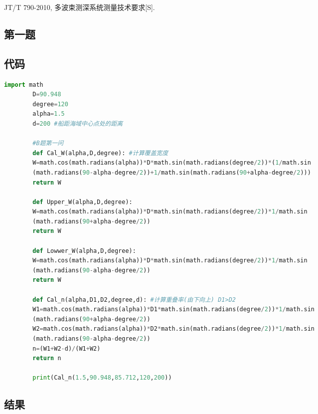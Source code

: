 \documentclass{cumcmthesis}
\begin{document}
\begin{thebibliography}{9}%
	 JT/T 790-2010, 多波束测深系统测量技术要求[S].
\end{thebibliography}
\newpage
\begin{appendices}
	\section{第一题}
	\subsection{代码}
	\begin{lstlisting}[language=python]
		import math
		D=90.948
		degree=120
		alpha=1.5
		d=200 #船距海域中心点处的距离
		
		#B题第一问
		def Cal_W(alpha,D,degree): #计算覆盖宽度
		W=math.cos(math.radians(alpha))*D*math.sin(math.radians(degree/2))*(1/math.sin
		(math.radians(90-alpha-degree/2))+1/math.sin(math.radians(90+alpha-degree/2)))
		return W
		
		def Upper_W(alpha,D,degree):
		W=math.cos(math.radians(alpha))*D*math.sin(math.radians(degree/2))*1/math.sin
		(math.radians(90+alpha-degree/2))
		return W
		
		def Lowwer_W(alpha,D,degree):
		W=math.cos(math.radians(alpha))*D*math.sin(math.radians(degree/2))*1/math.sin
		(math.radians(90-alpha-degree/2))
		return W
		
		def Cal_n(alpha,D1,D2,degree,d): #计算重叠率(由下向上) D1>D2
		W1=math.cos(math.radians(alpha))*D1*math.sin(math.radians(degree/2))*1/math.sin
		(math.radians(90+alpha-degree/2))
		W2=math.cos(math.radians(alpha))*D2*math.sin(math.radians(degree/2))*1/math.sin
		(math.radians(90-alpha-degree/2))
		n=(W1+W2-d)/(W1+W2)
		return n
		
		print(Cal_n(1.5,90.948,85.712,120,200))
	\end{lstlisting}
	\subsection{结果}
	\begin{table}[!htbp]
		\centering
		\caption{result1}
	\end{table}

\end{appendices}
\end{document}
